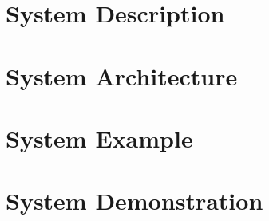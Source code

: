 
\section{System Description}

\section{System Architecture}

\section{System Example}

\section{System Demonstration}


